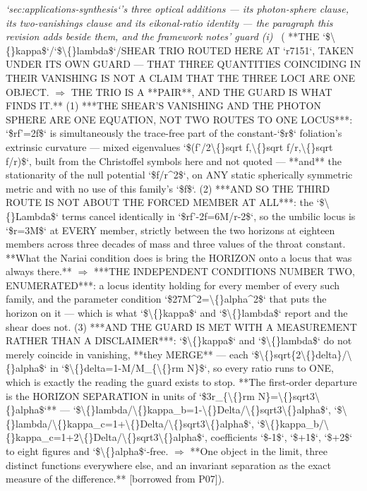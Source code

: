 \begin{description}
\textit{`sec:applications-synthesis`'s three optical additions --- its photon-sphere clause, its two-vanishings clause and its eikonal-ratio identity --- the paragraph this revision adds beside them, and the framework notes' guard (i)} \ ( **THE `\$\textbackslash\{\}kappa\$`/`\$\textbackslash\{\}lambda\$`/SHEAR TRIO ROUTED HERE AT `r7151`, TAKEN UNDER ITS OWN GUARD --- THAT THREE QUANTITIES COINCIDING IN THEIR VANISHING IS NOT A CLAIM THAT THE THREE LOCI ARE ONE OBJECT. \ensuremath{\Rightarrow} THE TRIO IS A **PAIR**, AND THE GUARD IS WHAT FINDS IT.** (1) ***THE SHEAR'S VANISHING AND THE PHOTON SPHERE ARE ONE EQUATION, NOT TWO ROUTES TO ONE LOCUS***: `\$rf'=2f\$` is simultaneously the trace-free part of the constant-`\$r\$` foliation's extrinsic curvature --- mixed eigenvalues `\$(f'/2\textbackslash\{\}sqrt f,\textbackslash\{\}sqrt f/r,\textbackslash\{\}sqrt f/r)\$`, built from the Christoffel symbols here and not quoted --- **and** the stationarity of the null potential `\$f/r\textasciicircum{}2\$`, on ANY static spherically symmetric metric and with no use of this family's `\$f\$`. (2) ***AND SO THE THIRD ROUTE IS NOT ABOUT THE FORCED MEMBER AT ALL***: the `\$\textbackslash\{\}Lambda\$` terms cancel identically in `\$rf'-2f=6M/r-2\$`, so the umbilic locus is `\$r=3M\$` at EVERY member, strictly between the two horizons at eighteen members across three decades of mass and three values of the throat constant. **What the Nariai condition does is bring the HORIZON onto a locus that was always there.** \ensuremath{\Rightarrow} ***THE INDEPENDENT CONDITIONS NUMBER TWO, ENUMERATED***: a locus identity holding for every member of every such family, and the parameter condition `\$27M\textasciicircum{}2=\textbackslash\{\}alpha\textasciicircum{}2\$` that puts the horizon on it --- which is what `\$\textbackslash\{\}kappa\$` and `\$\textbackslash\{\}lambda\$` report and the shear does not. (3) ***AND THE GUARD IS MET WITH A MEASUREMENT RATHER THAN A DISCLAIMER***: `\$\textbackslash\{\}kappa\$` and `\$\textbackslash\{\}lambda\$` do not merely coincide in vanishing, **they MERGE** --- each `\$\textbackslash\{\}sqrt\{2\textbackslash\{\}delta\}/\textbackslash\{\}alpha\$` in `\$\textbackslash\{\}delta=1-M/M\_\{\textbackslash\{\}rm N\}\$`, so every ratio runs to ONE, which is exactly the reading the guard exists to stop. **The first-order departure is the HORIZON SEPARATION in units of `\$3r\_\{\textbackslash\{\}rm N\}=\textbackslash\{\}sqrt3\textbackslash\{\}alpha\$`** --- `\$\textbackslash\{\}lambda/\textbackslash\{\}kappa\_b=1-\textbackslash\{\}Delta/\textbackslash\{\}sqrt3\textbackslash\{\}alpha\$`, `\$\textbackslash\{\}lambda/\textbackslash\{\}kappa\_c=1+\textbackslash\{\}Delta/\textbackslash\{\}sqrt3\textbackslash\{\}alpha\$`, `\$\textbackslash\{\}kappa\_b/\textbackslash\{\}kappa\_c=1+2\textbackslash\{\}Delta/\textbackslash\{\}sqrt3\textbackslash\{\}alpha\$`, coefficients `\$-1\$`, `\$+1\$`, `\$+2\$` to eight figures and `\$\textbackslash\{\}alpha\$`-free. \ensuremath{\Rightarrow} **One object in the limit, three distinct functions everywhere else, and an invariant separation as the exact measure of the difference.** [borrowed from P07]). 

\end{description}
